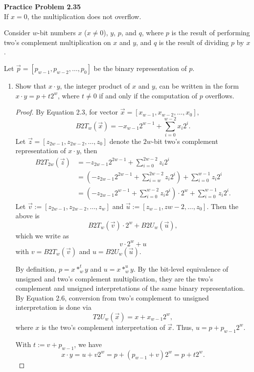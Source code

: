 \documentclass[11pt, oneside, a4paper]{article}
\begin{document}
\textbf{Practice Problem 2.35}\\

If $x=0$, the multiplication does not overflow. 

Consider $w$-bit numbers $x$ ($x\neq 0$), $y$, $p$, and $q$, where $p$ is the result of performing two’s complement multiplication on $x$ and $y$, and $q$ is the result of dividing $p$ by $x$.

Let $\vec{p}=[p_{w-1}, p_{w-2},\ldots, p_0]$ be the binary representation of $p$.

\begin{enumerate}
    \item Show that $x\cdot y$, the integer product of $x$ and $y$, can be written in the form
    $x \cdot y = p + t2^w$, where $t\neq 0$ if and only if the computation of $p$ overflows.
    \begin{proof}
        By Equation 2.3, for vector $\vec{x}=[x_{w-1}, x_{w-2}, \ldots, x_0]$,
        \[B2T_w(\vec{x}) = -x_{w-1}2^{w-1} + \sum_{i=0}^{w-2}x_i2^i.\]
        Let $\vec{z} = [z_{2w-1}, z_{2w-2}, \ldots, z_0]$ denote the $2w$-bit two's complement representation of $x\cdot y$, then
        \begin{align*}
            B2T_{2w}(\vec{z}) &= -z_{2w-1}2^{2w-1} + \sum_{i=0}^{2w-2}z_i2^i\\
            &= \left(-z_{2w-1}2^{2w-1} + \sum_{i=w}^{2w-2}z_i2^i\right) + \sum_{i=0}^{w-1}z_i2^i \\
            &= \left(-z_{2w-1}2^{w-1} + \sum_{i=0}^{w-2}z_i2^i\right)\cdot 2^w + \sum_{i=0}^{w-1}z_i2^i.
        \end{align*}
        Let $\vec{v} := [z_{2w-1}, z_{2w-2}, \ldots, z_w]$ and $\vec{u} := [z_{w-1}, z{w-2}, \ldots, z_0]$. Then the above is
        \[B2T_w(\vec{v})\cdot 2^w + B2U_w(\vec{u}),\]
        which we write as
        \[v\cdot 2^w + u\]
        with $v=B2T_w(\vec{v})$ and $u=B2U_w(\vec{u})$.
        
        By definition, $p= x *^t_w y$ and $u = x *^u_w y$. By the bit-level equivalence of unsigned and two's complement multiplication, they are the two's complement and unsigned interpretations of the same binary representation. By Equation 2.6, conversion from two's complement to unsigned interpretation is done via
        \[T2U_w(\vec{x}) = x + x_{w-1}2^w,\]
        where $x$ is the two's complement interpretation of $\vec{x}$.
        Thus, $u = p + p_{w-1}2^w.$ 
        
        With $t:=v+p_{w-1}$, we have
        \[x\cdot y = u + v2^w = p + (p_{w-1}+v)2^w = p + t2^w.\]


\end{proof}
\end{enumerate}
\end{document}
